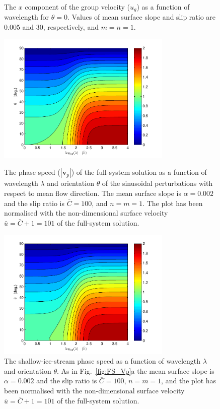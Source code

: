 \documentclass[10pt,a4paper]{book}
\begin{document}
\begin{figure}
\begin{minipage}[t]{0.5\linewidth}
\caption{The $x$ component of the group velocity ($u_g$) as a function of
wavelength for $\theta{=}0$. Values of mean surface slope and slip ratio
are 0.005 and 30, respectively, and $m=n=1$.
\label{fig:Ug}}
\end{minipage}
\end{figure}

\begin{figure}
  \begin{minipage}[t]{0.5\linewidth}
\centerline{
\includegraphics[width=8.3cm]{tc-2007-0016-f02a.pdf}
}
\caption{The phase speed ($|\mathbf{v}_p|$) of the full-system
solution as a function of wavelength $\lambda$ and orientation
$\theta$ of the sinusoidal perturbations with respect to mean flow
direction.  The mean surface slope is $\alpha{=}0.002$ and the slip ratio
is $\bar{C}{=}100$, and $n=m=1$.  The plot has been normalised with the non-dimensional
surface velocity $\bar{u}{=}\bar{C}{+}1{=}101$ of the full-system solution.
\label{fig:FS_Vp}}
\end{minipage}
\hspace{0.5cm}
\begin{minipage}[t]{0.5\linewidth}
\centerline{
\includegraphics[width=8.3cm]{tc-2007-0016-f02b.pdf}
}
\caption{The shallow-ice-stream phase speed as a
function of wavelength $\lambda$ and orientation $\theta$.  As in
Fig.~\ref{fig:FS_Vp}a the mean surface slope is $\alpha{=}0.002$ and the
slip ratio is $\bar{C}{=}100$, $n=m=1$,  and the plot has been normalised with the
non-dimensional surface velocity $\bar{u}{=}\bar{C}{+}1{=}101$ of the full-system
solution.
\label{fig:SSTREAM_Vp}}
\end{minipage}
 \end{figure}
\end{document}
